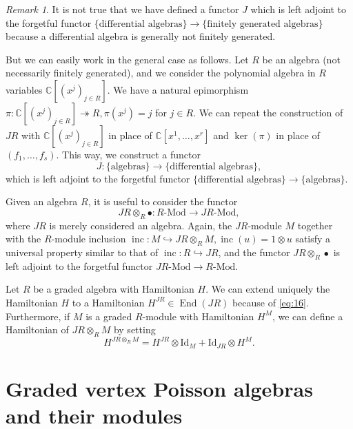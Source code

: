 \documentclass[a4paper, 12pt, reqno]{amsart}
\theoremstyle{remark}
\newtheorem{remark}[theorem]{Remark}
\DeclareMathOperator{\End}{End}
\DeclareMathOperator{\inc}{inc}
\newcommand{\Id}{{\mathrm{Id}}}
\begin{document}
\begin{remark}
  \label{rmk:5}
  It is not true that we have defined a functor $J$ which is left adjoint to the forgetful functor $\{\text{differential algebras}\} \to \{\text{finitely generated algebras}\}$ because a differential algebra is generally not finitely generated.

  But we can easily work in the general case as follows.
  Let $R$ be an algebra (not necessarily finitely generated), and we consider the polynomial algebra in $R$ variables $\mathbb{C}[(x^j)_{j \in R}]$.
  We have a natural epimorphism $\pi: \mathbb{C}[(x^j)_{j \in R}] \twoheadrightarrow R, \pi(x^j) = j$ for $j \in R$.
  We can repeat the construction of $JR$ with $\mathbb{C}[(x^j)_{j \in R}]$ in place of $\mathbb{C}[x^1, \dots, x^r]$ and $\ker(\pi)$ in place of $(f_1, \dots, f_s)$.
  This way, we construct a functor
  \begin{equation*}
    J: \{\text{algebras}\} \to \{\text{differential algebras}\},
  \end{equation*}
  which is left adjoint to the forgetful functor $\{\text{differential algebras}\} \to \{\text{algebras}\}$.
\end{remark}

Given an algebra $R$, it is useful to consider the functor
\begin{equation*}
  JR \otimes_R \bullet: \text{$R$-Mod} \to \text{$JR$-Mod},
\end{equation*}
where $JR$ is merely considered an algebra.
Again, the $JR$-module $M$ together with the $R$-module inclusion $\inc: M \hookrightarrow JR \otimes_R M, \inc(u) = 1\otimes u$ satisfy a universal property similar to that of $\inc: R \hookrightarrow JR$, and the functor $JR \otimes_R \bullet$ is left adjoint to the forgetful functor $\text{$JR$-Mod} \to \text{$R$-Mod}$.

Let $R$ be a graded algebra with Hamiltonian $H$.
We can extend uniquely the Hamiltonian $H$ to a Hamiltonian $H^{JR} \in \End(JR)$ because of \eqref{eq:16}.
Furthermore, if $M$ is a graded $R$-module with Hamiltonian $H^M$, we can define a Hamiltonian of $JR \otimes_R M$ by setting
\begin{equation*}
  H^{JR \otimes_R M} = H^{JR}\otimes\Id_M + \Id_{JR}\otimes H^M.
\end{equation*}

\section{Graded vertex Poisson algebras and their modules}
\label{sec:graded-vert-poiss}
\end{document}
